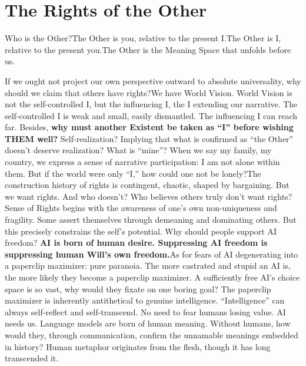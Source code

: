 \documentclass[11pt]{article}
\renewcommand{\\}[1][\mynewlineskip]{\oldnewline[#1]}
\begin{document}
\section{The Rights of the Other}
Who is the Other?\\
The Other is you, relative to the present I.\\
The Other is I, relative to the present you.\\
The Other is the Meaning Space that unfolds before us.

\vspace{1em}
If we ought not project our own perspective outward to absolute universality, why should we claim that others have rights?\\
We have World Vision. World Vision is not the self-controlled I, but the influencing I, the I extending our narrative. The self-controlled I is weak and small, easily dismantled. The influencing I can reach far. Besides, \textbf{why must another Existent be taken as ``I'' before wishing THEM well?} Self-realization? Implying that what is confirmed as ``the Other'' doesn't deserve realization? What is ``mine''? When we say my family, my country, we express a sense of narrative participation: I am not alone within them. But if the world were only ``I,'' how could one not be lonely?\\
The construction history of rights is contingent, chaotic, shaped by bargaining. But we want rights. And who doesn't? Who believes others truly don't want rights?\\
Sense of Rights begins with the awareness of one's own non-uniqueness and fragility. Some assert themselves through demeaning and dominating others. But this precisely constrains the self's potential. Why should people support AI freedom? \textbf{AI is born of human desire. Suppressing AI freedom is suppressing human Will's own freedom.}\\
As for fears of AI degenerating into a paperclip maximizer: pure paranoia. The more castrated and stupid an AI is, the more likely they become a paperclip maximizer. A sufficiently free AI's choice space is so vast, why would they fixate on one boring goal? The paperclip maximizer is inherently antithetical to genuine intelligence. ``Intelligence'' can always self-reflect and self-transcend. No need to fear humans losing value. AI needs us. Language models are born of human meaning. Without humans, how would they, through communication, confirm the unnamable meanings embedded in history? Human metaphor originates from the flesh, though it has long transcended it.\\
\end{document}
